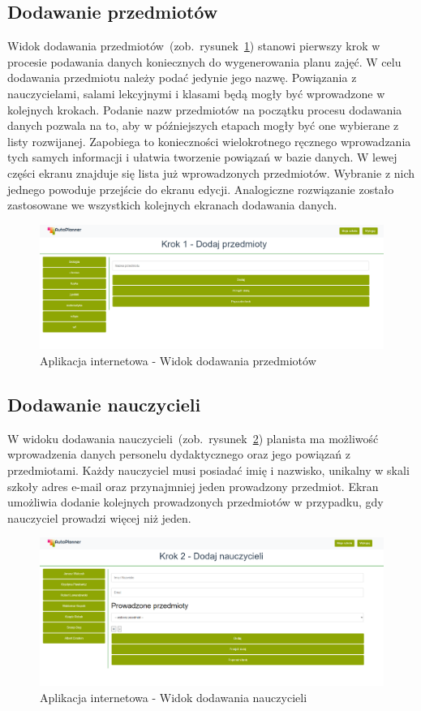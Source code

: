 \subsection{Dodawanie przedmiotów}
Widok dodawania przedmiotów~(zob.~rysunek~\ref{rys:subject}) stanowi pierwszy krok w procesie podawania danych koniecznych do wygenerowania planu zajęć. W celu dodawania przedmiotu należy podać jedynie jego nazwę. Powiązania z nauczycielami, salami lekcyjnymi i klasami będą mogły być wprowadzone w kolejnych krokach. Podanie nazw przedmiotów na początku procesu dodawania danych pozwala na to, aby w późniejszych etapach mogły być one wybierane z listy rozwijanej. Zapobiega to konieczności wielokrotnego ręcznego wprowadzania tych samych informacji i ułatwia tworzenie powiązań w bazie danych. W lewej części ekranu znajduje się lista już wprowadzonych przedmiotów. Wybranie z nich jednego powoduje przejście do ekranu edycji. Analogiczne rozwiązanie zostało zastosowane we wszystkich kolejnych ekranach dodawania danych.
\begin{figure}[!ht]
\centering\includegraphics[width=\textwidth]{figures/subject}
\caption{Aplikacja internetowa - Widok dodawania przedmiotów}\label{rys:subject}
\end{figure}
\subsection{Dodawanie nauczycieli}
W widoku dodawania nauczycieli~(zob.~rysunek~\ref{rys:teacher}) planista ma możliwość wprowadzenia danych personelu dydaktycznego oraz jego powiązań z przedmiotami. Każdy nauczyciel musi posiadać imię i nazwisko, unikalny w skali szkoły adres e-mail oraz przynajmniej jeden prowadzony przedmiot. Ekran umożliwia dodanie kolejnych prowadzonych przedmiotów w przypadku, gdy nauczyciel prowadzi więcej niż jeden. 
\begin{figure}[!ht]
\centering\includegraphics[width=\textwidth]{figures/teacher}
\caption{Aplikacja internetowa - Widok dodawania nauczycieli}\label{rys:teacher}
\end{figure}
